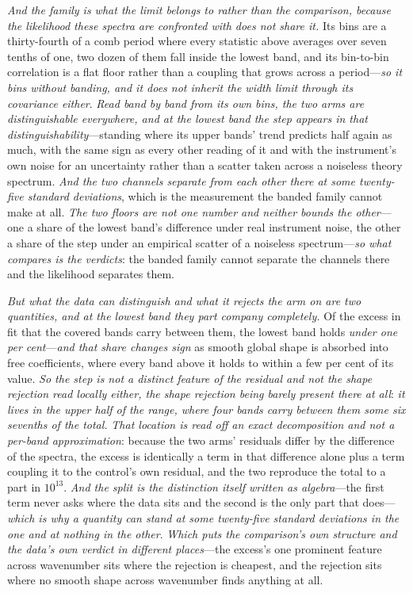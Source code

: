 \documentclass[11pt,a4paper]{article}
\theoremstyle{plain}
\theoremstyle{definition}
\theoremstyle{remark}
\begin{document}
\emph{And the family is what the limit belongs to rather than the comparison, because the likelihood these
spectra are confronted with does not share it.} Its bins are a thirty-fourth of a comb period where every
statistic above averages over seven tenths of one, two dozen of them fall inside the lowest band, and its
bin-to-bin correlation is a flat floor rather than a coupling that grows across a period---\emph{so it bins
without banding, and it does not inherit the width limit through its covariance either}. \emph{Read band by
band from its own bins, the two arms are distinguishable everywhere, and at the lowest band the step appears in
that distinguishability}---standing where its upper bands' trend predicts half again as much, with the same
sign as every other reading of it and with the instrument's own noise for an uncertainty rather than a scatter
taken across a noiseless theory spectrum. \emph{And the two channels separate from each other there at some
twenty-five standard deviations}, which is the measurement the banded family cannot make at all. \emph{The two
floors are not one number and neither bounds the other}---one a share of the lowest band's difference under
real instrument noise, the other a share of the step under an empirical scatter of a noiseless
spectrum---\emph{so what compares is the verdicts}: the banded family cannot separate the channels there and
the likelihood separates them.

\emph{But what the data can distinguish and what it rejects the arm on are two quantities, and at the lowest
band they part company completely.} Of the excess in fit that the covered bands carry between them, the lowest
band holds \emph{under one per cent}---\emph{and that share changes sign} as smooth global shape is absorbed
into free coefficients, where every band above it holds to within a few per cent of its value. \emph{So the
step is not a distinct feature of the residual and not the shape rejection read locally either, the shape
rejection being barely present there at all}: \emph{it lives in the upper half of the range, where four bands
carry between them some six sevenths of the total.} \emph{That location is read off an exact decomposition and
not a per-band approximation}: because the two arms' residuals differ by the difference of the spectra, the
excess is identically a term in that difference alone plus a term coupling it to the control's own residual,
and the two reproduce the total to a part in $10^{13}$. \emph{And the split is the distinction itself written
as algebra}---the first term never asks where the data sits and the second is the only part that
does---\emph{which is why a quantity can stand at some twenty-five standard deviations in the one and at
nothing in the other}. \emph{Which puts the comparison's own structure and the data's own verdict in different
places}---the excess's one prominent feature across wavenumber sits where the rejection is cheapest, and the
rejection sits where no smooth shape across wavenumber finds anything at all.
\end{document}
